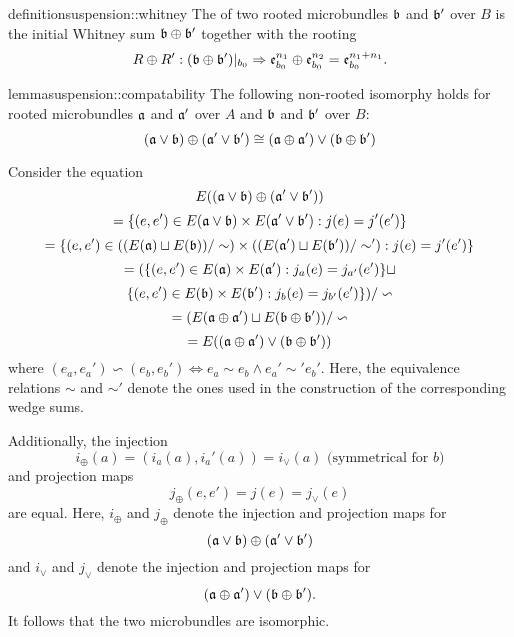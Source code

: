\begin{mystatement}{definition}{suspension::whitney}
    The  of two rooted microbundles $\bb$ and $\bb'$ over $B$
    is the initial Whitney sum $\whitney{\bb}{\bb'}$ together with the rooting
    \[ \germdef{\whitney{R}{R'}}{(\whitney{\bb}{\bb'})\restr{b_0}}{\whitney{\be[n_1]{b_0}}{\be[n_2]{b_0}} = \be[n_1 + n_1]{b_0}}. \]
\end{mystatement}

\begin{mystatement}{lemma}{suspension::compatability}   
    The following non-rooted isomorphy holds
    for rooted microbundles $\mathfrak{a}$ and $\mathfrak{a}'$ over $A$
    and $\bb$ and $\bb'$ over $B$: 
    \[
        \whitney{(\ba \vee \bb)}{(\ba' \vee \bb')}
        \cong (\whitney{\ba}{\ba'}) \vee (\whitney{\bb}{\bb'})
    \]
\end{mystatement}
\begin{myproof}
    Consider the equation
    \[ E(\whitney{(\ba \vee \bb)}{(\ba' \vee \bb')}) \]
    \[ = \set{(e, e') \in E(\ba \vee \bb) \cross E(\ba' \vee \bb')}{j(e) = j'(e')} \]
    \[ = \set{(e, e') \in ((E(\ba) \sqcup E(\bb)) / \sim) \cross ((E(\ba') \sqcup E(\bb')) / \sim')}{j(e) = j'(e')} \]
    \[ = (\{(e, e') \in E(\mathfrak{a}) \times E(\mathfrak{a}'):j_a(e) = j_{a'}(e')\} \sqcup \]
    \[ \set{(e, e') \in E(\bb) \cross E(\bb')}{j_b(e) = j_{b'}(e')}) / \backsim \]
    \[ = (E(\whitney{\ba}{\ba'}) \sqcup E(\whitney{\bb}{\bb'})) / \backsim \]
    \[ = E((\whitney{\ba}{\ba'}) \vee (\whitney{\bb}{\bb'})) \]
    where $(e_a, e_a') \backsim (e_b, e_b') \iff e_a \sim e_b \land e_a' \sim' e_b'$.
    Here, the equivalence relations $\sim$ and $\sim'$ denote the ones
    used in the construction of the corresponding wedge sums.

    Additionally, the injection
    \[ i_\oplus(a) = (i_a(a), i_a'(a)) = i_\vee(a) \text{ (symmetrical for $b$)}\]
    and projection maps
    \[ j_\oplus(e, e') = j(e) =  j_\vee(e) \]
    are equal.
    Here, $i_\oplus$ and $j_\oplus$ denote the injection and projection maps for
    \[ \whitney{(\ba \vee \bb)}{(\ba' \vee \bb')} \]
    and $i_\vee$ and $j_\vee$ denote the injection and projection maps for
    \[ (\whitney{\ba}{\ba'}) \vee (\whitney{\bb}{\bb'}). \]
    It follows that the two microbundles are isomorphic.
\end{myproof}